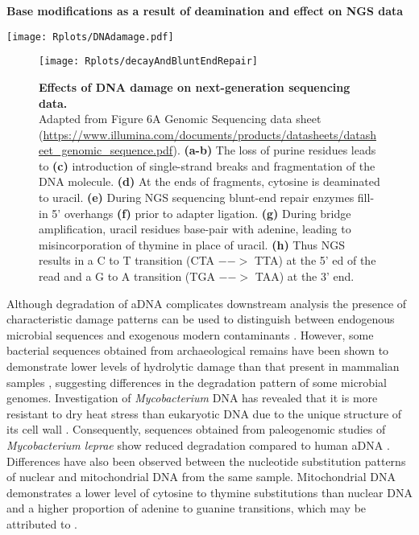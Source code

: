 \documentclass[12pt, a4paper]{article}
\begin{document}
\begin{table}[h]
	\centering
	\caption[Base modifications as a result of deamination and the effect on NGS data]{\textbf{Base modifications as a result of deamination and effect on NGS data}}\label{Table:BaseMods}
	\texttt{[image: Rplots/DNAdamage.pdf]}
\end{table}



\begin{figure}[!ht]
\centering
\singlespace
\texttt{[image: Rplots/decayAndBluntEndRepair]}
\caption[Effects of DNA damage on next-generation sequencing data]{\textbf{Effects of DNA damage on next-generation sequencing data.}\\[0.1cm] \small{Adapted from Figure 6A Genomic Sequencing data sheet (\url{https://www.illumina.com/documents/products/datasheets/datasheet_genomic_sequence.pdf}). \textbf{(a-b)} The loss of purine residues leads to \textbf{(c)} introduction of single-strand breaks and fragmentation of the DNA molecule. \textbf{(d)} At the ends of fragments, cytosine is deaminated to uracil. \textbf{(e)} During NGS sequencing blunt-end repair enzymes fill-in 5' overhangs \textbf{(f)} prior to adapter ligation. \textbf{(g)} During bridge amplification, uracil residues base-pair with adenine, leading to misincorporation of thymine in place of uracil. \textbf{(h)} Thus NGS results in a C to T transition (CTA $-->$ TTA) at the 5'  ed of the read and a G to A transition (TGA $-->$ TAA) at the 3' end.} }\label{fig:bluntEndRepair}
\end{figure}
\clearpage

Although degradation of aDNA complicates downstream analysis \cite{Kircher:2012aa} the presence of characteristic damage patterns can be used to distinguish between endogenous microbial sequences and exogenous modern contaminants \cite{Ginolhac:2011aa,Zaremba-Niedzwiedzka:2013aa, Kay:2014aa}.
However, some bacterial sequences obtained from archaeological remains have been shown to demonstrate lower levels of hydrolytic damage than that present in mammalian samples \cite{Schuenemann:2013aa,Ziesemer:2015aa}, suggesting differences in the degradation pattern of some microbial genomes.
Investigation of \textit{Mycobacterium} DNA has revealed that it is more resistant to dry heat stress than eukaryotic DNA due to the unique structure of its cell wall \cite{Nguyen-Hieu:2012aa}.
Consequently, sequences obtained from paleogenomic studies of \textit{Mycobacterium leprae} show reduced degradation compared to human aDNA \cite{Schuenemann:2013aa}. 
Differences have also been observed between the nucleotide substitution patterns of nuclear and mitochondrial DNA from the same sample. 
Mitochondrial DNA demonstrates a lower level of cytosine to thymine substitutions than nuclear DNA and a higher proportion of adenine to guanine transitions, which may be attributed to  \cite{Binladen:2006aa}. 
\end{document}
